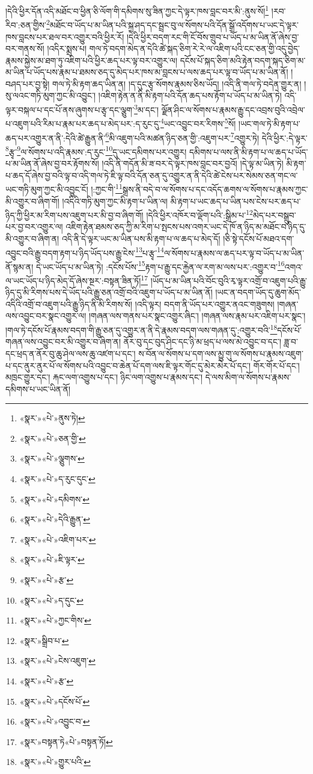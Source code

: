 །དེའི་ཕྱིར་དོན་འདི་མཐོང་བ་ཕྱིན་ཅི་ལོག་གི་དམིགས་སུ་ཟིན་ཀྱང་དེ་ལྟར་ཁས་བླང་བར་མི་:ནུས་སོ།\footnote{«སྣར་»«པེ་»ནུས་ཏེ།} །རབ་རིབ་:ཅན་གྱིས་\footnote{«སྣར་»«པེ་»ཅན་གྱི་}མཐོང་བ་ཡོད་པ་མ་ཡིན་པའི་སྐྲ་ཤད་དང་སྦྲང་བུ་ལ་སོགས་པའི་དོན་སྒྲོ་འདོགས་པ་ཡང་དེ་ལྟར་ཁས་བླངས་པར་ཐལ་བར་འགྱུར་བའི་ཕྱིར་རོ། །དེའི་ཕྱིར་བདག་རང་གི་ངོ་བོས་གྲུབ་པ་ཡོད་པ་མ་ཡིན་ནོ་ཞེས་བྱ་བར་གནས་སོ། །འདིར་སྨྲས་པ། གལ་ཏེ་བདག་མེད་ན་དེའི་ཚེ་སྐད་ཅིག་རེ་རེ་ལ་འཇིག་པའི་ངང་ཅན་གྱི་འདུ་བྱེད་རྣམས་སྐྱེས་མ་ཐག་ཏུ་འཇིག་པའི་ཕྱིར་ཆད་པར་ལྟ་བར་འགྱུར་ལ། དངོས་པོ་སྐད་ཅིག་མའི་རྟེན་བདག་སྐད་ཅིག་མ་མ་ཡིན་པ་ཡོད་པས་རྣམ་པ་ཐམས་ཅད་དུ་མེད་པར་ཁས་མ་བླངས་པ་ལས་ཆད་པར་ལྟ་བ་ཡོད་པ་མ་ཡིན་ནོ། །བཤད་པར་བྱ་སྟེ། གལ་ཏེ་མི་རྟག་ཆད་ཡིན་ན། །ད་དུང་རྩྭ་སོགས་རྣམས་ཅིས་ཡོད། །འདི་ནི་གལ་ཏེ་བདེན་གྱུར་ན། །
སུ་ལའང་གཏི་མུག་ཀྱང་མི་འབྱུང་། །འཇིག་རྟེན་ན་ནི་མི་རྟག་པའི་དོན་ཆད་པས་རྟོག་པ་ཡོད་པ་མ་ཡིན་ཏེ། འདི་ལྟར་བསྐལ་པ་དང་པོ་ནས་ཞུགས་པ་རྩྭ་དང་ལྕུག་\footnote{«སྣར་»«པེ་»ལྕུགས་}མ་དང་། ལྗོན་ཤིང་ལ་སོགས་པ་རྣམས་རྒྱུ་དང་འབྲས་བུའི་འབྲེལ་པ་འཇུག་པའི་རིམ་པ་རྣམ་པར་ཆད་པ་མེད་པར་:ད་རུང་དུ་\footnote{«སྣར་»«པེ་»ད་རུང་དུང་}ཡང་འབྱུང་བར་རིགས་\footnote{«སྣར་»«པེ་»དམིགས་}སོ། །ཡང་གལ་ཏེ་མི་རྟག་པ་ཆད་པར་འགྱུར་ན་ནི་:དེའི་ཚེ་རྒྱུན་ནི་\footnote{«སྣར་»«པེ་»དེའི་རྒྱུན་}མི་འཇུག་པའི་མཚན་ཉིད་ཅན་གྱི་:འཇུག་པར་\footnote{«སྣར་»«པེ་»འཇིག་པར་}འགྱུར་ཏེ། དེའི་ཕྱིར་:དེ་ལྟར་\footnote{«སྣར་»«པེ་»ཇི་ལྟར་}རྩྭ་\footnote{«སྣར་»«པེ་»རྩ་}ལ་སོགས་པ་འདི་རྣམས་:ད་རུང་\footnote{«སྣར་»«པེ་»ད་དུང་}དུ་ཡང་དམིགས་པར་འགྱུར། དམིགས་པ་ལས་ནི་མི་རྟག་པ་ལ་ཆད་པ་ཡོད་པ་མ་ཡིན་ནོ་ཞེས་བྱ་བར་རྟོགས་སོ། །འདི་ནི་གདོན་མི་ཟ་བར་དེ་ལྟར་ཁས་བླང་བར་བྱའོ། །དེ་ལྟ་མ་ཡིན་ཏེ། མི་རྟག་པ་ཆད་དོ་ཞེས་བྱ་བའི་ལྟ་བ་འདི་གལ་ཏེ་ཇི་ལྟ་བའི་དོན་ཅན་དུ་འགྱུར་ན་ནི་དེའི་ཚེ་ངེས་པར་སེམས་ཅན་གང་ལ་ཡང་གཏི་མུག་ཀྱང་མི་འབྱུང་ངོ། །:ཀྱང་གི་\footnote{«སྣར་»«པེ་»ཀྱང་གིས་}སྒྲས་ནི་བདེ་བ་ལ་སོགས་པ་དང་འདོད་ཆགས་ལ་སོགས་པ་རྣམས་ཀྱང་མི་འགྱུར་བ་ཞིག་གོ། །འདིའི་གཏི་མུག་ཀྱང་མི་རྟག་པ་ཡིན་ལ། མི་རྟག་པ་ཡང་ཆད་པ་ཡིན་པས་ངེས་པར་ཆད་པ་ཉིད་ཀྱི་ཕྱིར་མ་རིག་པས་འཇུག་པར་མི་བྱ་བ་ཞིག་གོ། །དེའི་ཕྱིར་འཁོར་བ་ལྡོག་པའི་:སྒྲིམ་པ་\footnote{«སྣར་»སྒྲིབ་པ་}མེད་པར་བསྒྲུབ་པར་བྱ་བར་འགྱུར་ལ། འཇིག་རྟེན་ཐམས་ཅད་ཀྱི་མ་རིག་པ་སྤངས་པས་འགར་ཡང་དེ་ཁོ་ན་ཉིད་མ་མཐོང་བ་ཉིད་དུ་མི་འགྱུར་བ་ཞིག་ན། འདི་ནི་དེ་ལྟར་ཡང་མ་ཡིན་པས་མི་རྟག་པ་ལ་ཆད་པ་མེད་དོ། །ཅི་སྟེ་དངོས་པོ་མཐའ་དག་འབྱུང་བའི་རྒྱུ་བདག་རྟག་པ་ཉིད་ཡོད་པས་རྒྱུ་ངེས་\footnote{«སྣར་»«པེ་»ངེས་འཇུག་}པ་རྩྭ་\footnote{«སྣར་»«པེ་»རྩ་}ལ་སོགས་པ་རྣམས་ལ་ཆད་པར་ལྟ་བ་ཡོད་པ་མ་ཡིན་ནོ་སྙམ་ན། དེ་ཡང་ཡོད་པ་མ་ཡིན་ཏེ། :དངོས་པོས་\footnote{«སྣར་»«པེ་»དངོས་པོ་}རྟག་པ་རྒྱུ་དང་རྐྱེན་ལ་རག་མ་ལས་པར་:འགྱུར་བ་\footnote{«སྣར་»«པེ་»འབྱུང་བ་}འགའ་ལ་ཡང་ཡོད་པ་ཉིད་མེད་དོ་ཞེས་སྔར་:བསྟན་ཟིན་ཏོ།\footnote{«སྣར་»བསྟན་ཏེ«པེ་»བསྟན་ཏོ།} །ཡོད་པ་མ་ཡིན་པའི་བོང་བུའི་རྭ་ལྟར་འགྲོ་བ་འཇུག་པའི་རྒྱུ་ཉིད་དུ་མི་རིགས་པས་དེ་ཡོད་པའི་རྒྱུ་ཅན་འགྲོ་བའི་འཇུག་པ་ཡོད་པ་མ་ཡིན་ནོ། །ཡང་ན་བདག་ཡོད་དུ་ཆུག་མོད་འདིའི་འགྲོ་བ་འཇུག་པའི་རྒྱུ་ཉིད་ནི་མི་རིགས་སོ། །འདི་ལྟར། བདག་ནི་ཡོད་པར་འགྱུར་ནའང་གཟུགས། །གཞན་ལས་འབྱུང་བར་སྣང་འགྱུར་ལ། །གཞན་ལས་གནས་པར་སྣང་འགྱུར་ཞིང་། །གཞན་ལས་རྣམ་པར་འཇིག་པར་སྣང་། །གལ་ཏེ་དངོས་པོ་རྣམས་བདག་གི་རྒྱུ་ཅན་དུ་འགྱུར་ན་ནི་དེ་རྣམས་བདག་ལས་གཞན་དུ་:འགྱུར་བའི་\footnote{«སྣར་»«པེ་»གྱུར་པའི་}དངོས་པོ་གཞན་ལས་འབྱུང་བར་མི་འགྱུར་བ་ཞིག་ན། ནོར་བུ་དང་བུད་ཤིང་དང་ཉི་མ་ཕྲད་པ་ལས་མེ་འབྱུང་བ་དང་། ཟླ་བ་དང་ཕྲད་ན་ནོར་བུ་ཆུ་ཤེལ་ལས་ཆུ་འཛག་པ་དང་། ས་བོན་ལ་སོགས་པ་དག་ལས་མྱུ་གུ་ལ་སོགས་པ་རྣམས་འཇུག་པ་དང་ནུར་ནུར་པོ་ལ་སོགས་པའི་འབྱུང་བ་ཆེན་པོ་དག་ལས་ཇི་ལྟར་གོང་དུ་མེར་མེར་པོ་དང་། གོར་གོར་པོ་དང་། མཁྲང་གྱུར་དང་། རྐང་ལག་འགྱུས་པ་དང་། ཉིང་ལག་འགྱུས་པ་རྣམས་དང་། དེ་ལས་མིག་ལ་སོགས་པ་རྣམས་དམིགས་པ་ཡང་ཡིན་ནོ། 
